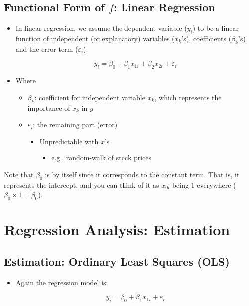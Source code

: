 \documentclass[10pt,article]{article}
\begin{document}
\subsection{Functional Form of \(f\): Linear Regression}
\label{sec:orga447038}
\begin{itemize}
\item In linear regression, we assume the dependent variable (\(y_{i}\)) to be a
linear function of independent (or explanatory) variables (\(x_{k}\)'s),
coefficients (\(\beta_{k}\)'s) and the error term (\(\varepsilon_{i}\)):

\[  y_{i} = \beta_0 + \beta_1 x_{1i} + \beta_2 x_{2i} + \varepsilon_{i} \]
\end{itemize}

\begin{itemize}
\item Where

\begin{itemize}
\item \(\beta_k\): coefficient for independent variable \(x_k\), which
represents the importance of \(x_{k}\) in \(y\)
\item \(\varepsilon_{i}\): the remaining part (error)

\begin{itemize}
\item Unpredictable with \(x\)'s
\begin{itemize}
\item e.g., random-walk of stock prices
\end{itemize}
\end{itemize}
\end{itemize}
\end{itemize}

\begin{mdframed}[frametitle={}]
Note that \(\beta_0\) is by itself since it corresponds to the constant term. That is, it 
represents the intercept, and you can think of it as \(x_{0i}\) being 1 everywhere 
(\(\beta_0 \times 1 = \beta_0\)).
\end{mdframed}
\section{Regression Analysis: Estimation}
\label{sec:orga8af186}
\subsection{Estimation: Ordinary Least Squares (OLS)}
\label{sec:org5c182d5}
\begin{itemize}
\item Again the regression model is:

\[  y_{i} = \beta_0 + \beta_1 x_{1i} + \varepsilon_{i} \]
\end{itemize}
\end{document}
